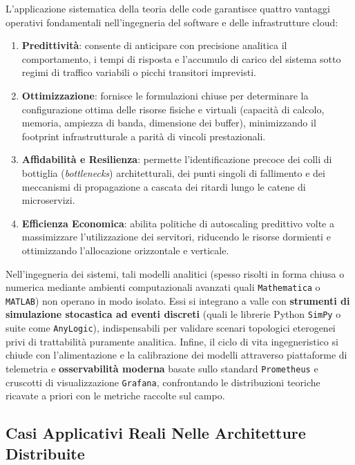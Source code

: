 \documentclass[11pt, a4paper]{article}
\begin{document}
L'applicazione sistematica della teoria delle code garantisce quattro vantaggi operativi fondamentali nell'ingegneria del software e delle infrastrutture cloud:
\begin{enumerate}[leftmargin=*]
    \item \textbf{Predittività}: consente di anticipare con precisione analitica il comportamento, i tempi di risposta e l'accumulo di carico del sistema sotto regimi di traffico variabili o picchi transitori imprevisti.
    \item \textbf{Ottimizzazione}: fornisce le formulazioni chiuse per determinare la configurazione ottima delle risorse fisiche e virtuali (capacità di calcolo, memoria, ampiezza di banda, dimensione dei buffer), minimizzando il footprint infrastrutturale a parità di vincoli prestazionali.
    \item \textbf{Affidabilità e Resilienza}: permette l'identificazione precoce dei colli di bottiglia (\emph{bottlenecks}) architetturali, dei punti singoli di fallimento e dei meccanismi di propagazione a cascata dei ritardi lungo le catene di microservizi.
    \item \textbf{Efficienza Economica}: abilita politiche di autoscaling predittivo volte a massimizzare l'utilizzazione dei servitori, riducendo le risorse dormienti e ottimizzando l'allocazione orizzontale e verticale.
\end{enumerate}

Nell'ingegneria dei sistemi, tali modelli analitici (spesso risolti in forma chiusa o numerica mediante ambienti computazionali avanzati quali \texttt{Mathematica} o \texttt{MATLAB}) non operano in modo isolato. Essi si integrano a valle con \textbf{strumenti di simulazione stocastica ad eventi discreti} (quali le librerie Python \texttt{SimPy} o suite come \texttt{AnyLogic}), indispensabili per validare scenari topologici eterogenei privi di trattabilità puramente analitica. Infine, il ciclo di vita ingegneristico si chiude con l'alimentazione e la calibrazione dei modelli attraverso piattaforme di telemetria e \textbf{osservabilità moderna} basate sullo standard \texttt{Prometheus} e cruscotti di visualizzazione \texttt{Grafana}, confrontando le distribuzioni teoriche ricavate a priori con le metriche raccolte sul campo.

\subsection{Casi Applicativi Reali Nelle Architetture Distribuite}
\end{document}
